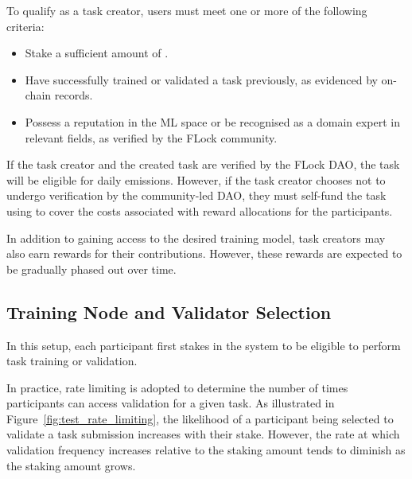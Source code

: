 \documentclass[conference]{IEEEtran}
\begin{document}
To qualify as a task creator, users must meet one or more of the following criteria:

\begin{itemize}
    \item Stake a sufficient amount of \FML.

    \item Have successfully trained or validated a task previously, as evidenced by on-chain records.
    
    \item Possess a reputation in the ML space or be recognised as a domain expert in relevant fields, as verified by the FLock community.
\end{itemize}

If the task creator and the created task are verified by the FLock DAO, the task will be eligible for daily \FML emissions. However, if the task creator chooses not to undergo verification by the community-led DAO, they must self-fund the task using \FML to cover the costs associated with reward allocations for the participants.

In addition to gaining access to the desired training model, task creators may also earn rewards for their contributions. However, these rewards are expected to be gradually phased out over time.

\subsection{Training Node and Validator Selection}

In this setup, each participant first stakes in the system to be eligible to perform task training or validation. 




In practice, rate limiting is adopted to determine the number of times participants can access validation for a given task. As illustrated in Figure~\ref{fig:test_rate_limiting}, the likelihood of a participant being selected to validate a task submission increases with their stake. However, the rate at which validation frequency increases relative to the staking amount tends to diminish as the staking amount grows.
\end{document}
